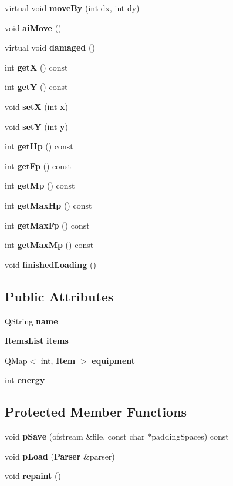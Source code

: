 \begin{CompactItemize}
virtual void {\bf move\-By} (int dx, int dy)
\item 
void {\bf ai\-Move} ()
\item 
virtual void {\bf damaged} ()
\item 
int {\bf get\-X} () const 
\item 
int {\bf get\-Y} () const 
\item 
void {\bf set\-X} (int {\bf x})
\item 
void {\bf set\-Y} (int {\bf y})
\item 
int {\bf get\-Hp} () const 
\item 
int {\bf get\-Fp} () const 
\item 
int {\bf get\-Mp} () const 
\item 
int {\bf get\-Max\-Hp} () const 
\item 
int {\bf get\-Max\-Fp} () const 
\item 
int {\bf get\-Max\-Mp} () const 
\item 
void {\bf finished\-Loading} ()
\end{CompactItemize}
\subsection*{Public Attributes}
\begin{CompactItemize}
\item 
QString {\bf name}
\item 
{\bf Items\-List} {\bf items}
\item 
QMap$<$ int, {\bf Item} $>$ {\bf equipment}
\item 
int {\bf energy}
\end{CompactItemize}
\subsection*{Protected Member Functions}
\begin{CompactItemize}
\item 
void {\bf p\-Save} (ofstream \&file, const char $\ast$padding\-Spaces) const 
\item 
void {\bf p\-Load} ({\bf Parser} \&parser)
\item 
void {\bf repaint} ()
\end{CompactItemize}
